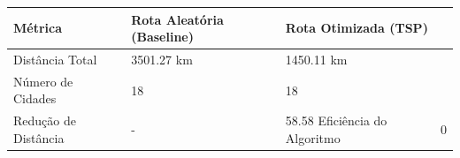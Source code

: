 \begin{tabular}{lll}
\toprule
Métrica & Rota Aleatória (Baseline) & Rota Otimizada (TSP) \\
\midrule
Distância Total & 3501.27 km & 1450.11 km \\
Número de Cidades & 18 & 18 \\
Redução de Distância & - & 58.58%
Eficiência do Algoritmo & 0%
\bottomrule
\end{tabular}
